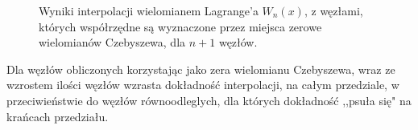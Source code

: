 \documentclass{article}
\begin{document}
\begin{figure}[H]

\caption{Wyniki interpolacji wielomianem Lagrange'a $W_n(x)$, z węzłami, których współrzędne są wyznaczone przez miejsca zerowe wielomianów Czebyszewa, dla $n+1$ węzłów.}
\end{figure}

Dla węzłów obliczonych korzystając jako zera wielomianu Czebyszewa, wraz ze wzrostem ilości węzłów wzrasta dokładność interpolacji, na całym przedziale, w przeciwieństwie do węzłów równoodleglych, dla których dokładność ,,psuła się" na krańcach przedziału. 
\end{document}

